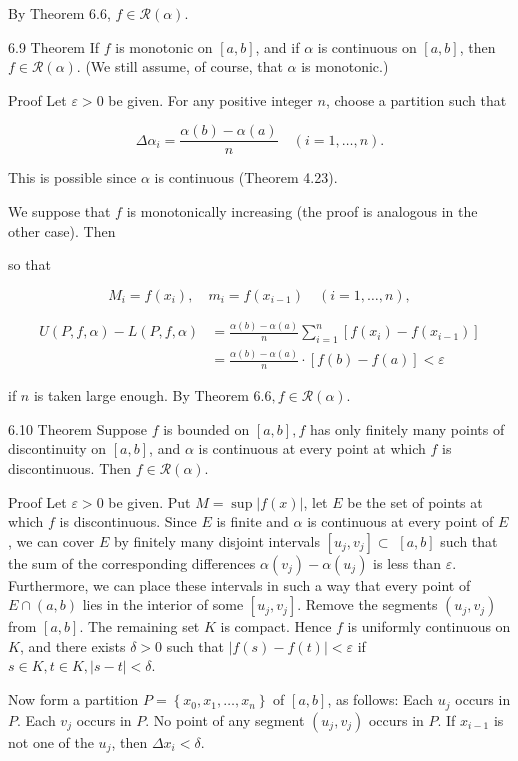 \documentclass[10pt]{article}
\begin{document}
By Theorem 6.6, $f \in \mathscr{R}(\alpha)$.

6.9 Theorem If $f$ is monotonic on $[a, b]$, and if $\alpha$ is continuous on $[a, b]$, then $f \in \mathscr{R}(\alpha)$. (We still assume, of course, that $\alpha$ is monotonic.)

Proof Let $\varepsilon>0$ be given. For any positive integer $n$, choose a partition such that

$$
\Delta \alpha_{i}=\frac{\alpha(b)-\alpha(a)}{n} \quad(i=1, \ldots, n) .
$$

This is possible since $\alpha$ is continuous (Theorem 4.23).

We suppose that $f$ is monotonically increasing (the proof is analogous in the other case). Then

so that

$$
M_{i}=f\left(x_{i}\right), \quad m_{i}=f\left(x_{i-1}\right) \quad(i=1, \ldots, n),
$$

$$
\begin{aligned}
U(P, f, \alpha)-L(P, f, \alpha) & =\frac{\alpha(b)-\alpha(a)}{n} \sum_{i=1}^{n}\left[f\left(x_{i}\right)-f\left(x_{i-1}\right)\right] \\
& =\frac{\alpha(b)-\alpha(a)}{n} \cdot[f(b)-f(a)]<\varepsilon
\end{aligned}
$$

if $n$ is taken large enough. By Theorem $6.6, f \in \mathscr{R}(\alpha)$.

6.10 Theorem Suppose $f$ is bounded on $[a, b], f$ has only finitely many points of discontinuity on $[a, b]$, and $\alpha$ is continuous at every point at which $f$ is discontinuous. Then $f \in \mathscr{R}(\alpha)$.

Proof Let $\varepsilon>0$ be given. Put $M=\sup |f(x)|$, let $E$ be the set of points at which $f$ is discontinuous. Since $E$ is finite and $\alpha$ is continuous at every point of $E$, we can cover $E$ by finitely many disjoint intervals $\left[u_{j}, v_{j}\right] \subset$ $[a, b]$ such that the sum of the corresponding differences $\alpha\left(v_{j}\right)-\alpha\left(u_{j}\right)$ is less than $\varepsilon$. Furthermore, we can place these intervals in such a way that every point of $E \cap(a, b)$ lies in the interior of some $\left[u_{j}, v_{j}\right]$. Remove the segments $\left(u_{j}, v_{j}\right)$ from $[a, b]$. The remaining set $K$ is compact. Hence $f$ is uniformly continuous on $K$, and there exists $\delta>0$ such that $|f(s)-f(t)|<\varepsilon$ if $s \in K, t \in K,|s-t|<\delta$.

Now form a partition $P=\left\{x_{0}, x_{1}, \ldots, x_{n}\right\}$ of $[a, b]$, as follows: Each $u_{j}$ occurs in $P$. Each $v_{j}$ occurs in $P$. No point of any segment $\left(u_{j}, v_{j}\right)$ occurs in $P$. If $x_{i-1}$ is not one of the $u_{j}$, then $\Delta x_{i}<\delta$.
\end{document}
